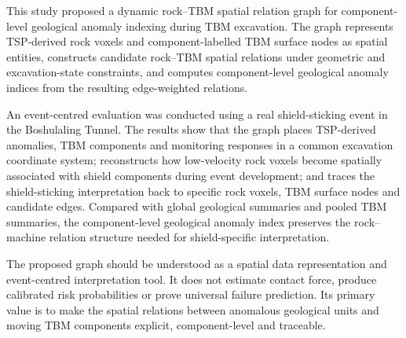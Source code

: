 This study proposed a dynamic rock--TBM spatial relation graph for component-level geological anomaly indexing during TBM excavation. The graph represents TSP-derived rock voxels and component-labelled TBM surface nodes as spatial entities, constructs candidate rock--TBM spatial relations under geometric and excavation-state constraints, and computes component-level geological anomaly indices from the resulting edge-weighted relations.

An event-centred evaluation was conducted using a real shield-sticking event in the Boshulaling Tunnel. The results show that the graph places TSP-derived anomalies, TBM components and monitoring responses in a common excavation coordinate system; reconstructs how low-velocity rock voxels become spatially associated with shield components during event development; and traces the shield-sticking interpretation back to specific rock voxels, TBM surface nodes and candidate edges. Compared with global geological summaries and pooled TBM summaries, the component-level geological anomaly index preserves the rock--machine relation structure needed for shield-specific interpretation.

The proposed graph should be understood as a spatial data representation and event-centred interpretation tool. It does not estimate contact force, produce calibrated risk probabilities or prove universal failure prediction. Its primary value is to make the spatial relations between anomalous geological units and moving TBM components explicit, component-level and traceable.